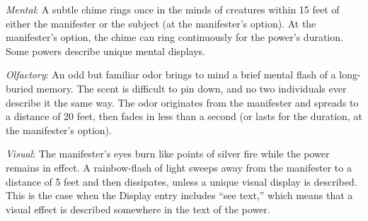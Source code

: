 \textit{Mental}: A subtle chime rings once in the minds of creatures within 15 feet of either the manifester or the subject (at the manifester's option). At the manifester's option, the chime can ring continuously for the power's duration. Some powers describe unique mental displays.

\textit{Olfactory}: An odd but familiar odor brings to mind a brief mental flash of a long-buried memory. The scent is difficult to pin down, and no two individuals ever describe it the same way. The odor originates from the manifester and spreads to a distance of 20 feet, then fades in less than a second (or lasts for the duration, at the manifester's option).

\textit{Visual}: The manifester's eyes burn like points of silver fire while the power remains in effect. A rainbow-flash of light sweeps away from the manifester to a distance of 5 feet and then dissipates, unless a unique visual display is described. This is the case when the Display entry includes ``see text,'' which means that a visual effect is described somewhere in the text of the power.